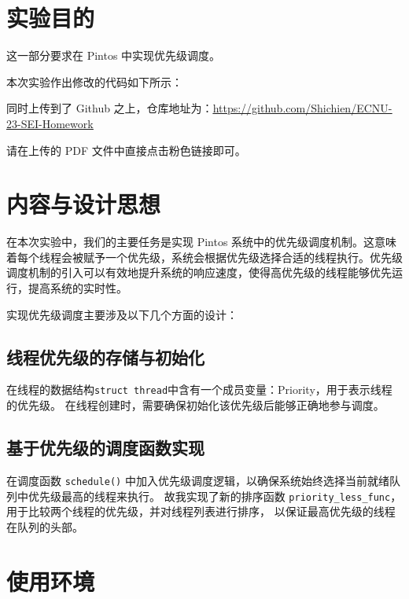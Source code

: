 \tableofcontents %

\section{实验目的}

这一部分要求在 Pintos 中实现优先级调度。

本次实验作出修改的代码如下所示：

同时上传到了 Github 之上，仓库地址为：\href{https://github.com/Shichien/ECNU-23-SEI-Homework/tree/main/%E6%93%8D%E4%BD%9C%E7%B3%BB%E7%BB%9F/%E5%AE%9E%E8%B7%B5%E8%AF%BE%E4%BD%9C%E4%B8%9A/Lec%202/lst2}{\underline{https://github.com/Shichien/ECNU-23-SEI-Homework}}

请在上传的 PDF 文件中直接点击粉色链接即可。

\section{内容与设计思想}

在本次实验中，我们的主要任务是实现 Pintos 系统中的优先级调度机制。这意味着每个线程会被赋予一个优先级，系统会根据优先级选择合适的线程执行。优先级调度机制的引入可以有效地提升系统的响应速度，使得高优先级的线程能够优先运行，提高系统的实时性。

实现优先级调度主要涉及以下几个方面的设计：

\subsection{线程优先级的存储与初始化}

在线程的数据结构\texttt{struct thread}中含有一个成员变量：Priority，用于表示线程的优先级。
在线程创建时，需要确保初始化该优先级后能够正确地参与调度。

\subsection{基于优先级的调度函数实现}

在调度函数 \texttt{schedule()} 中加入优先级调度逻辑，以确保系统始终选择当前就绪队列中优先级最高的线程来执行。
故我实现了新的排序函数 \texttt{priority\_less\_func}，用于比较两个线程的优先级，并对线程列表进行排序，
以保证最高优先级的线程在队列的头部。

\section{使用环境}

